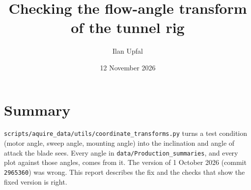 \documentclass[11pt]{article}
\title{Checking the flow-angle transform of the tunnel rig}
\author{Ilan Upfal}
\date{12 November 2026}
\newcommand{\code}[1]{\texttt{#1}}
\begin{document}
\maketitle

\section*{Summary}

\code{scripts/aquire\_data/utils/coordinate\_transforms.py} turns a test
condition (motor angle, sweep angle, mounting angle) into the inclination and
angle of attack the blade sees. Every angle in
\code{data/Production\_summaries}, and every plot against those angles, comes
from it. The version of 1 October 2026 (commit \code{2965360}) was wrong.
This report describes the fix and the checks that show the fixed version is
right.
\end{document}
